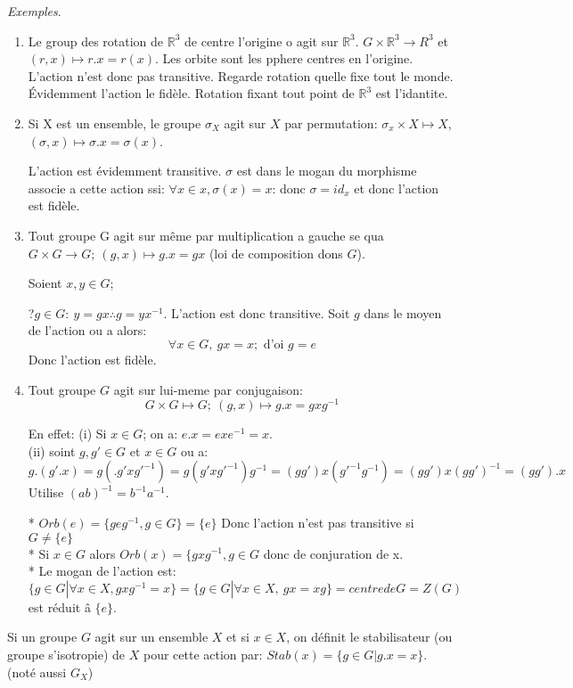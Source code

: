 \emph{Exemples}.
\begin{enumerate}
	\item Le group des rotation de $\mathbb{R}^3$ de centre l'origine o agit sur $\mathbb{R}^3$. $G\times\mathbb{R}^3\rightarrow{R}^3$ et $(r, x)\mapsto r.x=r(x).$
	Les orbite sont les pphere centres en l'origine. L'action n'est donc pas transitive. Regarde rotation quelle fixe tout le monde. Évidemment l'action le fidèle. Rotation fixant tout point de $\mathbb{R}^3$ est l'idantite.
	\item Si X est un ensemble, le groupe $\sigma_X$ agit sur $X$ par permutation:
	$\sigma_x \times X\mapsto X$, $(\sigma, x)\mapsto \sigma.x=\sigma(x)$.
	
	L'action est évidemment transitive. $\sigma$ est dans le mogan du morphisme associe a cette action ssi: $\forall x\in x, \sigma(x)=x$: donc $\sigma =id_x$ et donc l'action est fidèle.
	\item Tout groupe G agit sur même par multiplication a gauche se qua $G\times G \rightarrow G;\ (g,x)\mapsto g.x=gx$ (loi de composition dons $G$).
	
	Soient $x, y\in G$;
	
	?$g\in G:\ y=gx\therefore g=yx^{-1}$. L'action est donc transitive.
	Soit $g$ dans le moyen de l'action ou a alors:
	$$\forall x\in G,\ gx=x; \mbox{ d'oi } g=e$$
	Donc l'action est fidèle.
	\item Tout groupe $G$ agit sur lui-meme par conjugaison:
	$$G\times G\mapsto G;\ (g,x)\mapsto g.x=gxg^{-1}$$
	
	En effet: (i) Si $x\in G$; on a: $e.x = exe^{-1} = x$.\\
	(ii)  soint $g, g'\in G$ et $x\in G$ ou a:
	$$g.(g'.x)=g(.g'xg'^{-1})=g(g'xg'^{-1})g^{-1}=(gg')x(g'^{-1}g^{-1})=(gg')x(gg')^{-1}=(gg').x$$
	Utilise $(ab)^{-1}=b^{-1}a^{-1}$.
	
	* $Orb(e)=\{geg^{-1}, g\in G\}=\{e\}$ Donc l'action n'est pas transitive si $G\neq\{e\}$ \\%
	* Si $x\in G$ alors $Orb(x)=\{gxg^{-1}, g\in G$ donc de conjuration de x.\\
	* Le mogan de l'action est:
	$$\{g\in G | \forall x\in X, gxg^{-1} = x\} = \{g\in G | \forall x \in X,\ gx=xg\}=centre de G = Z(G)$$
	est réduit â $\{e\}$.
\end{enumerate}

\begin{definition}
	Si un groupe $G$ agit sur un ensemble $X$ et si $x\in X$, on définit le stabilisateur (ou groupe s'isotropie) de $X$ pour cette action par: $Stab(x)=\{g\in G | g.x=x\}$. (noté aussi $G_X$)
\end{definition}

